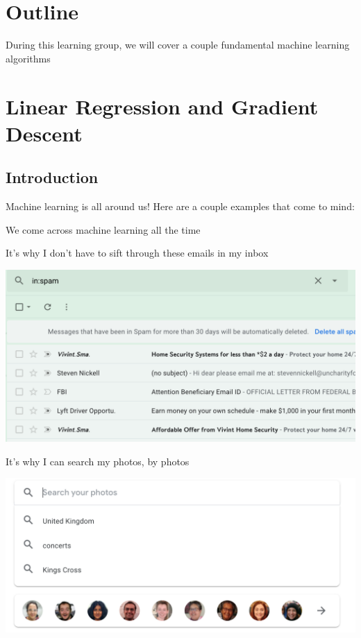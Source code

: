 \documentclass[12pt]{article}
\begin{document}
\section{Outline}

During this learning group, we will cover a couple fundamental machine learning algorithms

\section{Linear Regression and Gradient Descent}
\subsection{Introduction}

Machine learning is all around us! Here are a couple examples that come to mind: 

We come across machine learning all the time 


It's why I don't have to sift through these emails in my inbox

\includegraphics[width=\textwidth]{spam}

It's why I can search my photos, by photos

\includegraphics[width=\textwidth]{photo-search}
\end{document}
